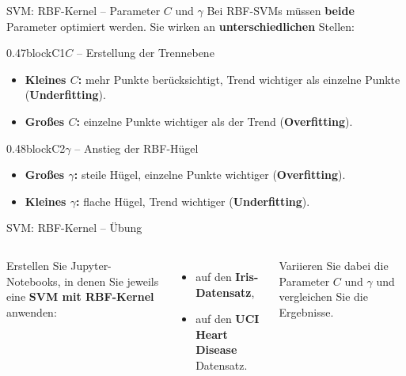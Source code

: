 \begin{frame}{SVM: RBF-Kernel -- Parameter $C$ und $\gamma$}
Bei RBF-SVMs müssen \textbf{beide} Parameter optimiert werden. Sie wirken an
\textbf{unterschiedlichen} Stellen:

\vspace{0.6em}
\begin{blockrow}
  \begin{blockcol}{0.47\textwidth}{blockC1}{$C$ -- Erstellung der Trennebene}
\begin{itemize}
  \item \textbf{Kleines $C$:} mehr Punkte berücksichtigt, Trend wichtiger
        als einzelne Punkte (\textbf{Underfitting}).
  \item \textbf{Großes $C$:} einzelne Punkte wichtiger als der Trend
        (\textbf{Overfitting}).
\end{itemize}
  \end{blockcol}
  \begin{blockcol}{0.48\textwidth}{blockC2}{$\gamma$ -- Anstieg der RBF-Hügel}
\begin{itemize}
  \item \textbf{Großes $\gamma$:} steile Hügel, einzelne Punkte wichtiger
        (\textbf{Overfitting}).
  \item \textbf{Kleines $\gamma$:} flache Hügel, Trend wichtiger
        (\textbf{Underfitting}).
\end{itemize}
  \end{blockcol}
\end{blockrow}
\end{frame}

\makequizpage{\QUIZURL}{\QUIZQRCODE}{\QUIZIMAGE}
\makequestionspage{\FRAGENIMAGE}

\begin{frame}{SVM: RBF-Kernel -- Übung}
\begin{columns}
Erstellen Sie Jupyter-Notebooks, in denen Sie jeweils eine \textbf{SVM mit
RBF-Kernel} anwenden:

\begin{itemize}
  \item auf den \textbf{Iris-Datensatz},
  \item auf den \textbf{UCI Heart Disease} Datensatz.
\end{itemize}

\vspace{0.4em}
Variieren Sie dabei die Parameter \textbf{$C$} und \textbf{$\gamma$} und
vergleichen Sie die Ergebnisse.

\centering
{}
\end{columns}
\end{frame}

\makequestionspage{\FRAGENIMAGE}